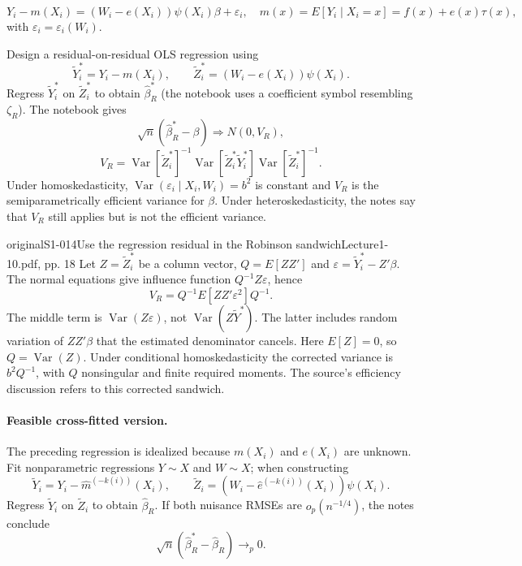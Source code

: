\[
Y_i-m(X_i)=(W_i-e(X_i))\psi(X_i)\beta+\varepsilon_i,
\quad m(x)=E[Y_i\mid X_i=x]=f(x)+e(x)\tau(x),
\]
with $\varepsilon_i=\varepsilon_i(W_i)$.

Design a residual-on-residual OLS regression using
\[
\widetilde Y_i^*=Y_i-m(X_i),\qquad
\widetilde Z_i^*=(W_i-e(X_i))\psi(X_i).
\]
Regress $\widetilde Y_i^*$ on $\widetilde Z_i^*$ to obtain $\widehat\beta_R^*$ (the notebook uses a coefficient symbol resembling $\zeta_R$).  The notebook gives
\[
\sqrt n(\widehat\beta_R^*-\beta)\Rightarrow N(0,V_R),
\]
\[
V_R=\operatorname{Var}[\widetilde Z_i^*]^{-1}
\operatorname{Var}[\widetilde Z_i^*\widetilde Y_i^*]
\operatorname{Var}[\widetilde Z_i^*]^{-1}.
\]
Under homoskedasticity, $\operatorname{Var}(\varepsilon_i\mid X_i,W_i)=b^2$ is constant and $V_R$ is the semiparametrically efficient variance for $\beta$. Under heteroskedasticity, the notes say that $V_R$ still applies but is not the efficient variance.
\begin{reviewnote}{original}{S1-014}{Use the regression residual in the Robinson sandwich}{Lecture1-10.pdf, pp. 18}
Let $Z=\widetilde Z_i^*$ be a column vector, $Q=E[ZZ']$ and $\varepsilon=\widetilde Y_i^*-Z'\beta$. The normal equations give influence function $Q^{-1}Z\varepsilon$, hence
\[
V_R=Q^{-1}E[ZZ'\varepsilon^2]Q^{-1}.
\]
The middle term is $\operatorname{Var}(Z\varepsilon)$, not $\operatorname{Var}(Z\widetilde Y^*)$. The latter includes random variation of $ZZ'\beta$ that the estimated denominator cancels. Here $E[Z]=0$, so $Q=\operatorname{Var}(Z)$. Under conditional homoskedasticity the corrected variance is $b^2Q^{-1}$, with $Q$ nonsingular and finite required moments. The source's efficiency discussion refers to this corrected sandwich.
\end{reviewnote}


\paragraph{Feasible cross-fitted version.}
The preceding regression is idealized because $m(X_i)$ and $e(X_i)$ are unknown. Fit nonparametric regressions $Y\sim X$ and $W\sim X$;  when constructing
\[
\widetilde Y_i=Y_i-\widehat m^{(-k(i))}(X_i),\qquad
\widetilde Z_i=(W_i-\widehat e^{(-k(i))}(X_i))\psi(X_i).
\]
Regress $\widetilde Y_i$ on $\widetilde Z_i$ to obtain $\widehat\beta_R$. If both nuisance RMSEs are $o_p(n^{-1/4})$, the notes conclude
\[
\sqrt n(\widehat\beta_R^*-\widehat\beta_R)\longrightarrow_p0.
\]
